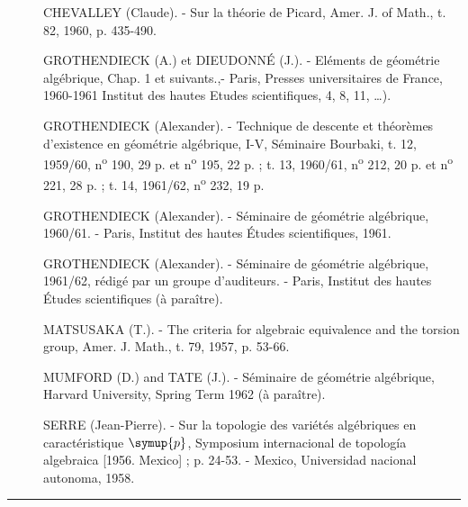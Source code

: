 \begin{description}
\item[{\normalfont [1]}] CHEVALLEY (Claude). - Sur la théorie de Picard,
Amer. J. of Math., t. 82, 1960, p. 435-490.

\item[{\normalfont [2]}] GROTHENDIECK (A.) et DIEUDONNÉ (J.). - Eléments de géométrie
algébrique, Chap. 1 et suivants.,- Paris, Presses universitaires de France,
1960-1961 Institut des hautes Etudes scientifiques, 4, 8, 11, \ldots).

\item[{\normalfont [3]}] GROTHENDIECK (Alexander). - Technique de descente et théorèmes
d'existence en géométrie algébrique, I-V, Séminaire Bourbaki, t. 12,
1959/60, n\textsuperscript{o} 190, 29 p. et n\textsuperscript{o} 195, 22 p. ;
t. 13, 1960/61, n\textsuperscript{o} 212, 20 p. et
n\textsuperscript{o} 221, 28 p. ; t. 14, 1961/62,
n\textsuperscript{o} 232, 19 p.

\item[{\normalfont [4]}] GROTHENDIECK (Alexander). - Séminaire de géométrie algébrique,
1960/61. - Paris, Institut des hautes Études scientifiques, 1961.

\item[{\normalfont [5]}] GROTHENDIECK (Alexander). - Séminaire de géométrie algébrique,
1961/62, rédigé par un groupe d'auditeurs. - Paris, Institut des hautes Études
scientifiques (à paraître).

\item[{\normalfont [6]}] MATSUSAKA (T.). - The criteria for algebraic equivalence and the
torsion group, Amer. J. Math., t. 79, 1957, p. 53-66.

\item[{\normalfont [7]}] MUMFORD (D.) and TATE (J.). - Séminaire de géométrie algébrique,
Harvard University, Spring Term 1962 (à paraître).

\item[{\normalfont [8]}] SERRE (Jean-Pierre). - Sur la topologie des variétés algébriques
en caractéristique $\symup{p}$, Symposium internacional de topología algebraica
[1956. Mexico] ; p. 24-53. - Mexico, Universidad nacional autonoma, 1958.
\end{description}

\begin{center}\rule{2.5cm}{0.4pt}\end{center}
